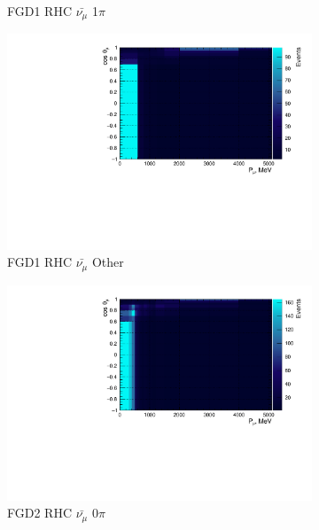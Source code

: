 \begin{figure}
\begin{subfigure}{.32\textwidth}
  \caption{FGD1 RHC $\bar{\nu_{\mu}}$ 1$\pi$}
  \label{fig:2d_FGD1_anti-numuCC_1pi}
\end{subfigure}
\begin{subfigure}{.32\textwidth}
  \centering
  \includegraphics[width=0.95\linewidth]{figs/NomMC_MC_FGD1_anti-numuCC_other}
  \caption{FGD1 RHC $\bar{\nu_{\mu}}$ Other}
  \label{fig:2d_FGD1_anti-numuCC_other}
\end{subfigure}
\centering
\begin{subfigure}{.32\textwidth}
  \centering
  \includegraphics[width=0.95\linewidth]{figs/NomMC_MC_FGD2_anti-numuCC_0pi}
  \caption{FGD2 RHC $\bar{\nu_{\mu}}$ 0$\pi$}
  \label{fig:2d_FGD2_anti-numuCC_0pi}
\end{subfigure}
\begin{subfigure}{.32\textwidth}
  \centering

\end{subfigure}
\end{figure}
